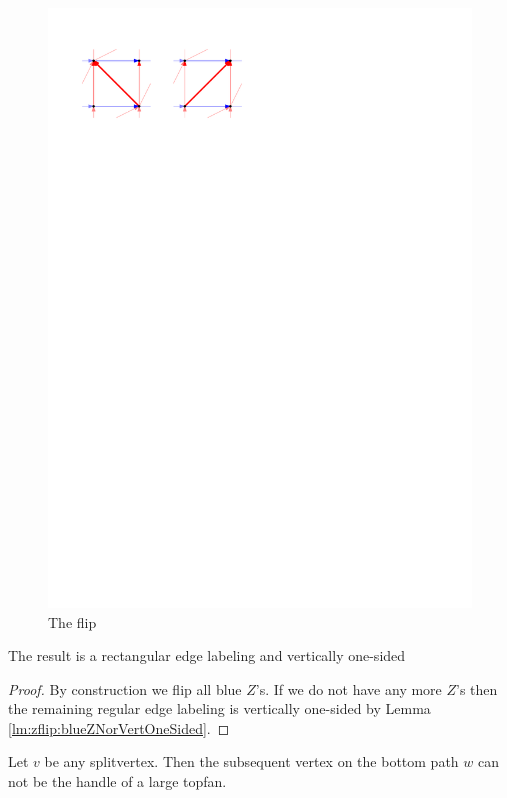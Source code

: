  \begin{figure}[h]
    \centering
    \includegraphics[scale=1]{unifiedAlgo/img/zflip/flip.pdf}
    \caption{The flip}
    \label{fig:zflip:flip}
  \end{figure}

  \begin{lemma}
    \label{lm:sweep:vertOnsided}
    The result is a rectangular edge labeling and vertically one-sided
  \end{lemma}
  \begin{proof}
    By construction we flip all blue $Z$'s. If we do not have any more $Z$'s then the remaining regular edge labeling is vertically one-sided by Lemma \ref{lm:zflip:blueZNorVertOneSided}.
  \end{proof}

  \begin{lemma}
    \label{lm:zflip:NoTwoSplitsAboveEachOtherVertOnesided}
    Let $v$ be any splitvertex. Then the subsequent vertex on the bottom path $w$ can not be the handle of a large topfan.
  \end{lemma}


